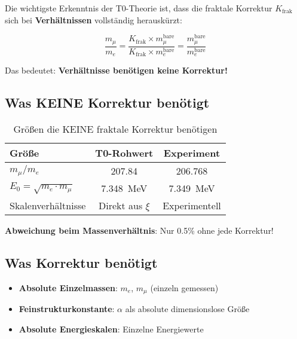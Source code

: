 \documentclass[12pt,a4paper]{article}
\theoremstyle{definition}
\begin{document}
	\begin{tcolorbox}[colback=blue!10!white,colframe=blue!75!black,title=Fraktale Korrekturen k\"urzen sich in Verh\"altnissen]
		Die wichtigste Erkenntnis der T0-Theorie ist, dass die fraktale Korrektur $K_{\text{frak}}$ sich bei \textbf{Verh\"altnissen} vollst\"andig herausk\"urzt:
		
		\begin{equation}
			\frac{m_\mu}{m_e} = \frac{K_{\text{frak}} \times m_\mu^{\text{bare}}}{K_{\text{frak}} \times m_e^{\text{bare}}} = \frac{m_\mu^{\text{bare}}}{m_e^{\text{bare}}}
		\end{equation}
		
		Das bedeutet: \textbf{Verh\"altnisse ben\"otigen keine Korrektur!}
	\end{tcolorbox}
	
	\subsection{Was KEINE Korrektur ben\"otigt}
	
	\begin{table}[h]
		\centering
		\begin{tabular}{@{}lcc@{}}
			\toprule
			\textbf{Gr\"o\ss{}e} & \textbf{T0-Rohwert} & \textbf{Experiment} \\
			\midrule
			$m_\mu/m_e$ & 207.84 & 206.768 \\
			$E_0 = \sqrt{m_e \cdot m_\mu}$ & \SI{7.348}{\MeV} & \SI{7.349}{\MeV} \\
			Skalenverh\"altnisse & Direkt aus $\xi$ & Experimentell \\
			\bottomrule
		\end{tabular}
		\caption{Gr\"o\ss{}en die KEINE fraktale Korrektur ben\"otigen}
	\end{table}
	
	\textbf{Abweichung beim Massenverh\"altnis}: Nur 0.5\% ohne jede Korrektur!
	
	\subsection{Was Korrektur ben\"otigt}
	
	\begin{itemize}
		\item \textbf{Absolute Einzelmassen}: $m_e$, $m_\mu$ (einzeln gemessen)
		\item \textbf{Feinstrukturkonstante}: $\alpha$ als absolute dimensionslose Gr\"o\ss{}e
		\item \textbf{Absolute Energieskalen}: Einzelne Energiewerte
	\end{itemize}
	
\end{document}
